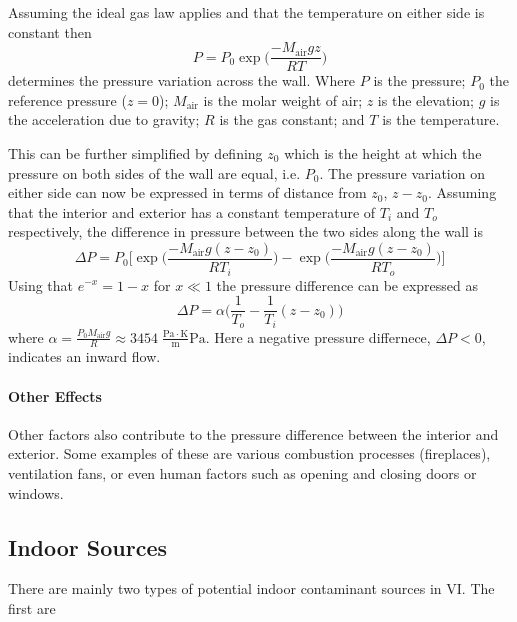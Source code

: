 Assuming the ideal gas law applies and that the temperature on either side is constant then
\begin{equation}
  P = P_0 \exp{\Big( \frac{-M_\mathrm{air}gz}{RT} \Big)}
\end{equation}
determines the pressure variation across the wall.
Where $P$ is the pressure; $P_0$ the reference pressure ($z=0$); $M_\mathrm{air}$ is the molar weight of air; $z$ is the elevation; $g$ is the acceleration due to gravity; $R$ is the gas constant; and $T$ is the temperature.\par

This can be further simplified by defining $z_0$ which is the height at which the pressure on both sides of the wall are equal, i.e. $P_0$.
The pressure variation on either side can now be expressed in terms of distance from $z_0$, $z-z_0$.
Assuming that the interior and exterior has a constant temperature of $T_i$ and $T_o$ respectively, the difference in pressure between the two sides along the wall is
\begin{equation}
  \Delta P = P_0 \Big[ \exp{\Big( \frac{-M_\mathrm{air}g(z-z_0)}{RT_i} \Big)} - \exp{\Big( \frac{-M_\mathrm{air}g(z-z_0)}{RT_o} \Big)} \Big]
\end{equation}
Using that $e^{-x} = 1 - x$ for $x \ll 1$ the pressure difference can be expressed as
\begin{equation}
  \Delta P = \alpha \Big( \frac{1}{T_o} - \frac{1}{T_i} (z-z_0)\Big)
\end{equation}
where $\alpha = \frac{P_0 M_\mathrm{air} g}{R} \approx 3454 \; \mathrm{ \frac{Pa \cdot K}{m}Pa}$.
Here a negative pressure differnece, $\Delta P < 0$, indicates an inward flow.\par

\paragraph{Other Effects}

Other factors also contribute to the pressure difference between the interior and exterior.
Some examples of these are various combustion processes (fireplaces), ventilation fans, or even human factors such as opening and closing doors or windows.

\subsection{Indoor Sources}

There are mainly two types of potential indoor contaminant sources in VI.
The first are 
